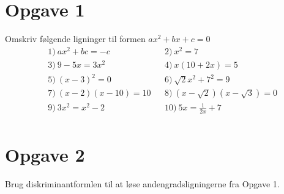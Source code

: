\section*{Opgave 1}
Omskriv følgende ligninger til formen $ax^2+bx+c = 0$
\begin{align*}
&1) \ ax^2+bc = -c   &&2) \  x^2=7  \\
&3) \ 9-5x=3x^2   &&4) \ x(10+2x)=5   \\
&5) \ (x-3)^2 =0  &&6) \  \sqrt{2}x^2+7^2=9   \\
&7) \  (x-2)(x-10)=10  &&8) \  (x-\sqrt{2})(x-\sqrt{3})=0  \\
&9) \  3x^2=x^2-2  &&10) \ 5x = \frac{1}{2x}+7   \\
\end{align*}

\section*{Opgave 2}
Brug diskriminantformlen til at løse andengradsligningerne fra Opgave 1.
